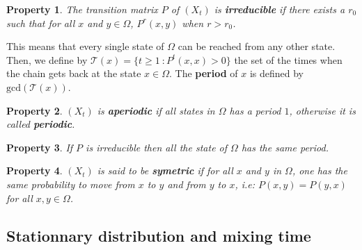 \documentclass[11pt]{article}
\newtheorem{propriete}{Property}[subsection]
\begin{document}
\begin{propriete}
  The transition matrix $P$ of $(X_t)$ is \textbf{irreducible} if there exists a $r_0$ such that for all $x$ and $y \in \Omega$, $P^r(x,y)$ when $r>r_0$.
\end{propriete}

This means that every single state of $\Omega$ can be reached from any other state. Then, we define by $\mathcal{T}(x)=\{t\geq{1} \ : P^t(x,x)>0\}$ the set of the times when the chain gets back at the state $x\in \Omega$. The \textbf{period} of $x$ is defined by $\mathrm{gcd}(\mathcal{T}(x))$.

\begin{propriete}
  $(X_t)$ is \textbf{aperiodic} if all states in $\Omega$ has a period $1$, otherwise it is called \textbf{periodic}.
\end{propriete}

\begin{propriete}\label{prop:irr-ap}
  If $P$ is irreducible then all the state of $\Omega$ has the same period.
\end{propriete}

\begin{propriete}
  $(X_t)$ is said to be \textbf{symetric} if for all $x$ and $y$ in $\Omega$, one has the same probability to move from $x$ to $y$ and from $y$ to $x$, i.e: $P(x,y) = P(y,x)$ for all $x,y \in \Omega$.
\end{propriete}




\subsection{Stationnary distribution and mixing time}
\end{document}
